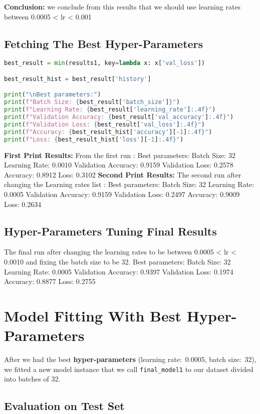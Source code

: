 \documentclass[12pt,a4paper]{article}
\begin{document}
\textbf{Conclusion:}
we conclude from this results that we should use learning rates between 0.0005 < lr < 0.001

\subsection{Fetching The Best Hyper-Parameters}
\begin{lstlisting}[language=Python]
best_result = min(results1, key=lambda x: x['val_loss'])

best_result_hist = best_result['history']

print("\nBest parameters:")
print(f"Batch Size: {best_result['batch_size']}")
print(f"Learning Rate: {best_result['learning_rate']:.4f}")
print(f"Validation Accuracy: {best_result['val_accuracy']:.4f}")
print(f"Validation Loss: {best_result['val_loss']:.4f}")
print(f"Accuracy: {best_result_hist['accuracy'][-1]:.4f}")
print(f"Loss: {best_result_hist['loss'][-1]:.4f}")
\end{lstlisting}
\textbf{First Print Results:}
From the first run :
Best parameters:
Batch Size: 32
Learning Rate: 0.0010
Validation Accuracy: 0.9159
Validation Loss: 0.2578
Accuracy: 0.8912
Loss: 0.3102
\textbf{Second Print Results:}
The second run after changing the Learning rates list :
Best parameters:
Batch Size: 32
Learning Rate: 0.0005
Validation Accuracy: 0.9159
Validation Loss: 0.2497
Accuracy: 0.9009
Loss: 0.2634

\subsection{Hyper-Parameters Tuning Final Results}

The final run after changing the learning rates to be between 0.0005 < lr < 0.0010 and fixing the batch size to be 32.
Best parameters:
Batch Size: 32
Learning Rate: 0.0005
Validation Accuracy: 0.9397
Validation Loss: 0.1974
Accuracy: 0.8877
Loss: 0.2755

\section{Model Fitting With Best Hyper-Parameters}
After we had the best \textbf{hyper-parameters} (learning rate:~0.0005, batch size:~32), we fitted a new model instance that we call \texttt{final\_model1} to our dataset divided into batches of 32.

\subsection{Evaluation on Test Set}
\end{document}
